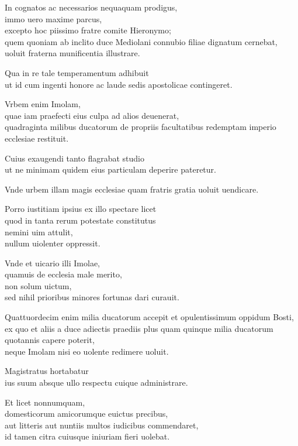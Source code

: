 \documentclass[a5paper,twoside]{article}
\begin{document}
In cognatos ac necessarios nequaquam prodigus, \\
immo uero maxime parcus, \\
excepto hoc piissimo fratre comite Hieronymo; \\
quem quoniam ab inclito duce Mediolani connubio filiae dignatum cernebat, \\
uoluit fraterna munificentia illustrare.  

Qua in re tale temperamentum adhibuit \\
ut id cum ingenti honore ac laude sedis apostolicae contingeret. 

Vrbem enim Imolam, \\
quae iam praefecti eius culpa ad alios deuenerat, \\
quadraginta milibus ducatorum de propriis facultatibus redemptam imperio ecclesiae restituit. 

Cuius exaugendi tanto flagrabat studio \\
ut ne minimam quidem eius particulam deperire pateretur. 

Vnde urbem illam magis ecclesiae quam fratris gratia uoluit uendicare.

Porro iustitiam ipsius ex illo spectare licet \\
quod in tanta rerum potestate constitutus \\
nemini uim attulit, \\
nullum uiolenter oppressit. 

Vnde et uicario illi Imolae, \\
quamuis de ecclesia male merito, \\
non solum uictum, \\
sed nihil prioribus minores fortunas dari curauit. 

Quattuordecim enim milia ducatorum accepit et opulentissimum oppidum Bosti, \\
ex quo et aliis a duce adiectis praediis plus quam quinque milia ducatorum quotannis capere poterit, \\
neque Imolam nisi eo uolente redimere uoluit. 

Magistratus hortabatur \\
ius suum absque ullo respectu cuique administrare.  

Et licet nonnumquam, \\
domesticorum amicorumque euictus precibus, \\
aut litteris aut nuntiis multos iudicibus commendaret, \\
id tamen citra cuiusque iniuriam fieri uolebat. 
\end{document}

